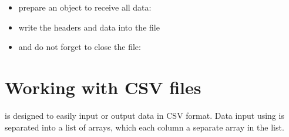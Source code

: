 \documentclass[a4paper,10pt,openany,english]{sphinxmanual}
\begin{document}
\begin{itemize}
\item {} 
prepare an object to receive all data:

\begin{sphinxVerbatim}[commandchars=\\\{\}]
  
    
\end{sphinxVerbatim}

\item {} 
write the headers and data into the file

\begin{sphinxVerbatim}[commandchars=\\\{\}]
\end{sphinxVerbatim}

\item {} 
and do not forget to close the file:

\begin{sphinxVerbatim}[commandchars=\\\{\}]
\end{sphinxVerbatim}

\end{itemize}
\newpage

\section{Working with CSV files}
\label{tutorial:working-with-csv-files}
{\hyperref[egadsapi:egads.input.text_file_io.EgadsCsv]{}} is designed to easily input or output data in CSV format. Data input using {\hyperref[egadsapi:egads.input.text_file_io.EgadsCsv]{}} is separated into a list of arrays, which each column a separate array in the list.
\end{document}
